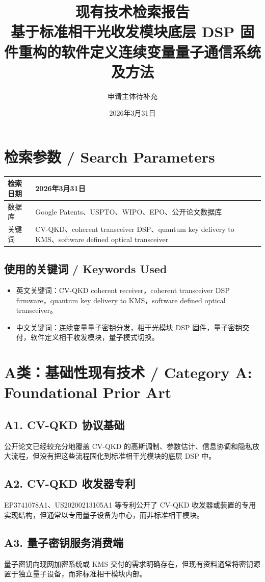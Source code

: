 ﻿\documentclass[12pt,a4paper]{article}
\title{\textbf{现有技术检索报告}\\[0.5em]\Large 基于标准相干光收发模块底层 DSP 固件重构的软件定义连续变量量子通信系统及方法}
\author{申请主体待补充}
\date{2026年3月31日}
\begin{document}
\maketitle
\tableofcontents
\newpage
\section{检索参数 / Search Parameters}
\begin{tabular}{|p{4cm}|p{9cm}|}
\hline
检索日期 & 2026年3月31日 \\
\hline
数据库 & Google Patents、USPTO、WIPO、EPO、公开论文数据库 \\
\hline
关键词 & CV-QKD、coherent transceiver DSP、quantum key delivery to KMS、software defined optical transceiver \\
\hline
\end{tabular}

\subsection{使用的关键词 / Keywords Used}
\begin{itemize}
\item 英文关键词：CV-QKD coherent receiver，coherent transceiver DSP firmware，quantum key delivery to KMS，software defined optical transceiver。
\item 中文关键词：连续变量量子密钥分发，相干光模块 DSP 固件，量子密钥交付，软件定义相干收发模块，量子模式切换。
\end{itemize}

\section{A类：基础性现有技术 / Category A: Foundational Prior Art}
\subsection{A1. CV-QKD 协议基础}
公开论文已经较充分地覆盖 CV-QKD 的高斯调制、参数估计、信息协调和隐私放大流程，但没有把这些流程固化到标准相干光模块的底层 DSP 中。

\subsection{A2. CV-QKD 收发器专利}
EP3741078A1、US20200213105A1 等专利公开了 CV-QKD 收发器或装置的专用实现结构，但通常以专用量子设备为中心，而非标准相干模块。

\subsection{A3. 量子密钥服务消费端}
量子密钥向现网加密系统或 KMS 交付的需求明确存在，但现有资料通常将密钥源置于独立量子设备，而非标准相干模块内部。
\end{document}
